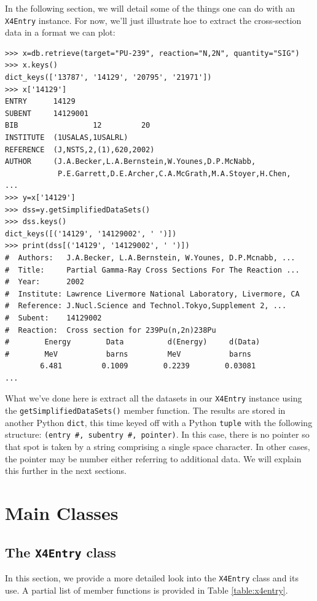 \documentclass[11pt]{article}
\begin{document}
In the following section, we will detail some of the things one can do with an \texttt{X4Entry} instance.  For now, we'll just illustrate hoe to extract the cross-section data in a format we can plot:
\begin{verbatim}
>>> x=db.retrieve(target="PU-239", reaction="N,2N", quantity="SIG")
>>> x.keys()
dict_keys(['13787', '14129', '20795', '21971'])
>>> x['14129']
ENTRY      14129
SUBENT     14129001
BIB                 12         20
INSTITUTE  (1USALAS,1USALRL)
REFERENCE  (J,NSTS,2,(1),620,2002)
AUTHOR     (J.A.Becker,L.A.Bernstein,W.Younes,D.P.McNabb,
            P.E.Garrett,D.E.Archer,C.A.McGrath,M.A.Stoyer,H.Chen,
...
>>> y=x['14129']
>>> dss=y.getSimplifiedDataSets()
>>> dss.keys()
dict_keys([('14129', '14129002', ' ')])
>>> print(dss[('14129', '14129002', ' ')])
#  Authors:   J.A.Becker, L.A.Bernstein, W.Younes, D.P.Mcnabb, ...
#  Title:     Partial Gamma-Ray Cross Sections For The Reaction ...
#  Year:      2002
#  Institute: Lawrence Livermore National Laboratory, Livermore, CA
#  Reference: J.Nucl.Science and Technol.Tokyo,Supplement 2, ...
#  Subent:    14129002
#  Reaction:  Cross section for 239Pu(n,2n)238Pu
#        Energy        Data          d(Energy)     d(Data)
#        MeV           barns         MeV           barns
        6.481         0.1009        0.2239        0.03081
...
\end{verbatim}
What we've done here is extract all the datasets in our \texttt{X4Entry}  instance using the \texttt{getSimplifiedDataSets()} member function.  The results are stored in another Python \texttt{dict}, this time keyed off with a Python \texttt{tuple} with the following structure: \texttt{(entry \#, subentry \#, pointer)}.  In this case, there is no pointer  so that spot is taken by a string comprising a single space character.   In other cases, the pointer may be number either referring to additional data.  We will explain this further in the next sections.

\section{Main Classes}

\subsection{The \texttt{X4Entry} class}

In this section,  we provide a more detailed look into the \texttt{X4Entry} class and its use.  A partial list of member functions is provided in Table \ref{table:x4entry}.
\end{document}
